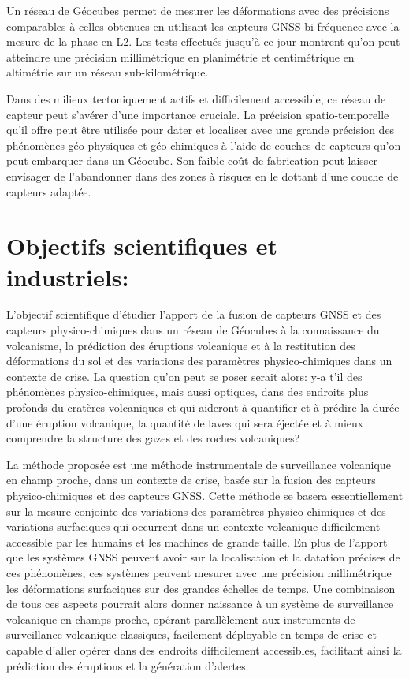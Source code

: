 \documentclass{themeensg}
\begin{document}
\begin{appendices}
Un réseau de Géocubes permet de mesurer les déformations avec des précisions comparables à celles obtenues en utilisant les capteurs GNSS bi-fréquence avec la mesure de la phase en L2. Les tests effectués jusqu'à ce jour montrent qu'on peut atteindre une précision millimétrique en planimétrie et centimétrique en altimétrie sur un réseau sub-kilométrique.

Dans des milieux tectoniquement actifs et difficilement accessible, ce réseau de capteur peut s'avérer d'une importance cruciale. La précision spatio-temporelle qu'il offre peut être utilisée pour dater et localiser avec une grande précision des phénomènes géo-physiques et géo-chimiques à l'aide de couches de capteurs qu'on peut embarquer dans un Géocube. Son faible coût de fabrication peut laisser envisager de l'abandonner dans des zones à risques en le dottant d'une couche de capteurs adaptée.

\section*{Objectifs scientifiques et industriels:}

L'objectif scientifique d'étudier l'apport de la fusion de capteurs GNSS et des capteurs physico-chimiques dans un réseau de Géocubes à la connaissance du volcanisme, la prédiction des éruptions volcanique et à la restitution des déformations du sol et des variations des paramètres physico-chimiques dans un contexte de crise. La question qu'on peut se poser serait alors: y-a t'il des phénomènes physico-chimiques, mais aussi optiques, dans des endroits plus profonds du cratères volcaniques et qui aideront à quantifier et à prédire la durée d'une éruption volcanique, la quantité de laves qui sera éjectée et à mieux comprendre la structure des gazes et des roches volcaniques?

La méthode proposée est une méthode instrumentale de surveillance volcanique en champ proche, dans un contexte de crise, basée sur la fusion des capteurs physico-chimiques et des capteurs GNSS. Cette méthode se basera essentiellement sur la mesure conjointe des variations des paramètres physico-chimiques et des variations surfaciques qui occurrent dans un contexte volcanique difficilement accessible par les humains et les machines de grande taille. En plus de l'apport que les systèmes GNSS peuvent avoir sur la localisation et la datation précises de ces phénomènes, ces systèmes peuvent mesurer avec une précision millimétrique les déformations surfaciques sur des grandes échelles de temps. Une combinaison de tous ces aspects pourrait alors donner naissance à un système de surveillance volcanique en champs proche, opérant parallèlement aux instruments de surveillance volcanique classiques, facilement déployable en temps de crise et capable d'aller opérer dans des endroits difficilement accessibles, facilitant ainsi la prédiction des éruptions et la génération d'alertes.


\end{appendices}
\end{document}
